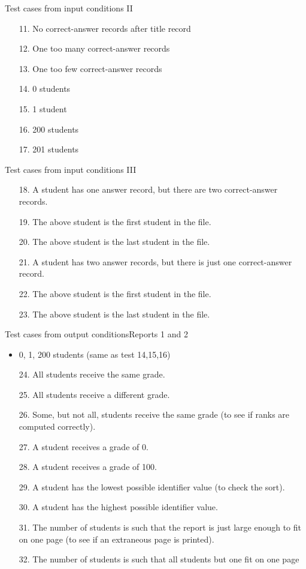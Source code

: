 \begin{Frame}{Test cases from input conditions II}
  \begin{itemize}
    \item[11.] No correct-answer records after title record
    \item[12.] One too many correct-answer records
    \item[13.] One too few correct-answer records
    \item[14.] 0 students
    \item[15.] 1 student
    \item[16.] 200 students
    \item[17.] 201 students
  \end{itemize}
\end{Frame}

\begin{Frame}{Test cases from input conditions III}
  \begin{itemize}
    \item[18.] A student has one answer record, but there are two correct-answer records.
    \item[19.] The above student is the first student in the file.
    \item[20.] The above student is the last student in the file.
    \item[21.] A student has two answer records, but there is just one correct-answer record.
    \item[22.] The above student is the first student in the file.
    \item[23.] The above student is the last student in the file.
  \end{itemize}
\end{Frame}

\begin{Frame}{Test cases from output conditions}{Reports 1 and 2}
  \begin{itemize}
    \item 0, 1, 200  students (same as test 14,15,16)
    \item[24.] All students receive the same grade.
    \item[25.] All students receive a different grade.
    \item[26.] Some, but not all, students receive the same grade (to see if ranks are computed correctly).
    \item[27.] A student receives a grade of 0.
    \item[28.] A student receives a grade of 100.
    \item[29.] A student has the lowest possible identifier value (to check the sort).
    \item[30.] A student has the highest possible identifier value.
    \item[31.] The number of students is such that the report is just large enough to fit on one page (to see if an extraneous page is printed).
    \item[32.] The number of students is such that all students but one fit on one page
  \end{itemize}
\end{Frame}

